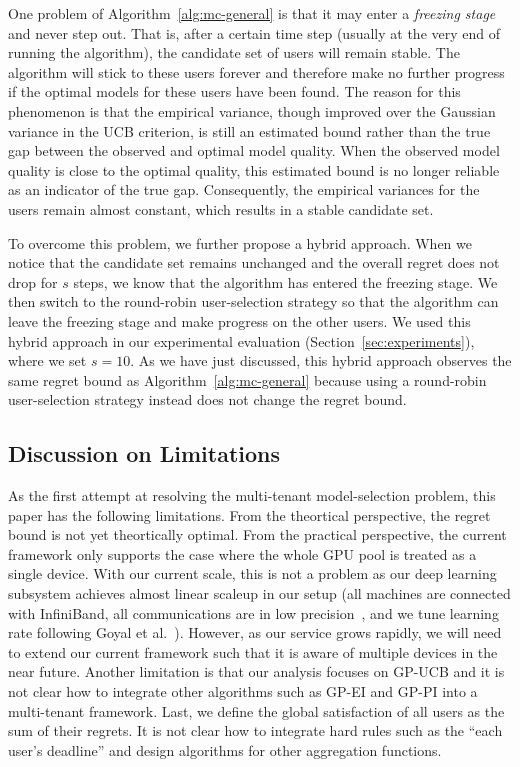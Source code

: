 \documentclass[letterpaper]{vldb}
\begin{document}
One problem of Algorithm~\ref{alg:mc-general} is that it may enter a \emph{freezing stage} and never step out.
That is, after a certain time step (usually at the very end of running the algorithm), the candidate set of users will remain stable.
The algorithm will stick to these users forever and therefore make no further progress if the optimal models for these users have been found.
The reason for this phenomenon is that the empirical variance, though improved over the Gaussian variance in the UCB criterion, is still an estimated bound rather than the true gap between the observed and optimal model quality.
When the observed model quality is close to the optimal quality, this estimated bound is no longer reliable as an indicator of the true gap.
Consequently, the empirical variances for the users remain almost constant, which results in a stable candidate set.

To overcome this problem, we further propose a hybrid approach.
When we notice that the candidate set remains unchanged and the overall regret does not drop for $s$ steps,
we know that the algorithm has entered the freezing stage.
We then switch to the round-robin user-selection strategy so that the algorithm can leave the freezing stage and make progress on the other users.
We used this hybrid approach in our experimental evaluation (Section~\ref{sec:experiments}), where we set $s=10$.
As we have just discussed, this hybrid approach observes the same regret bound as Algorithm~\ref{alg:mc-general} because using a round-robin user-selection strategy instead does not change the regret bound.

\subsection{Discussion on Limitations} \label{sec:limitations}

As the first attempt
at resolving the multi-tenant model-selection problem,
this paper has the following limitations.
From the theortical perspective, the regret bound
is not yet theortically optimal.
From the practical perspective,
the current framework only supports the case where
the whole GPU pool is treated as a single device.
With our current scale, this is not
a problem as our deep learning
subsystem achieves almost linear scaleup
in our setup
(all machines are connected with InfiniBand,
all communications are in low precision~\cite{zhang2016zipml},
and we tune learning rate following Goyal et al.~\cite{2017arXiv170602677G}).
However, as our service grows
rapidly, we will need to extend our current framework
such that it is aware of multiple devices in the near future.
Another limitation is that our
analysis focuses on GP-UCB and it is not clear
how to integrate other algorithms such as
GP-EI and GP-PI into a multi-tenant 
framework. Last, we define the global
satisfaction of all users as the sum 
of their regrets. It is not clear how to
integrate hard rules such as the ``each user's deadline'' 
and design
algorithms for other aggregation functions.
\end{document}
